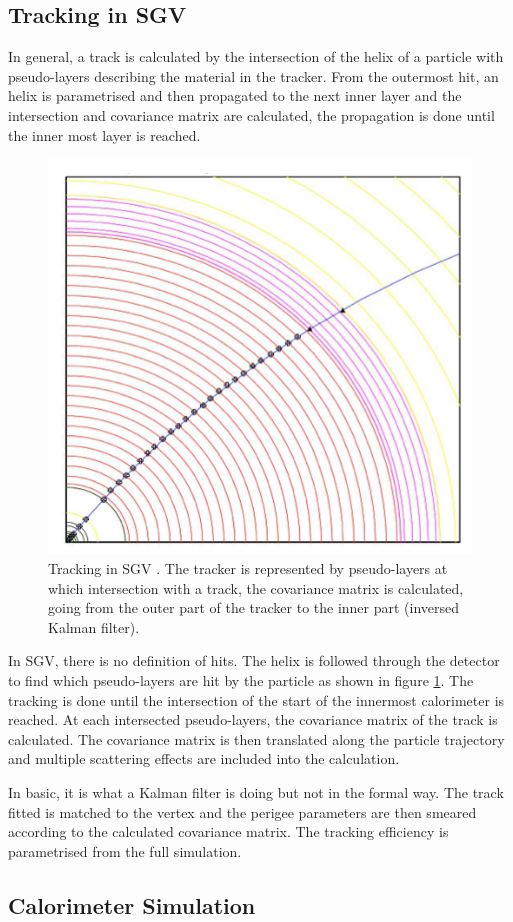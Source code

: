 \subsection{Tracking in SGV}

In general, a track is calculated by the intersection of the helix of a particle with pseudo-layers describing the material in the tracker. From the outermost hit, an helix is parametrised and then propagated to the next inner layer and the intersection and covariance matrix are calculated, the propagation is done until the inner most layer is reached.

\begin{figure}[t]
  \centering
  \includegraphics[width=0.3\linewidth]{chap6/fig_SGV/Tracking_SGV.png}
  \caption{Tracking in SGV \cite{Berggren2012}. The tracker is represented by pseudo-layers at which intersection with a track, the covariance matrix is calculated, going from the outer part of the tracker to the inner part (inversed Kalman filter).}
  \label{fig:tracking_sgv}
\end{figure}

In SGV, there is no definition of hits. The helix is followed through the detector to find which pseudo-layers are hit by the particle as shown in figure \ref{fig:tracking_sgv}. The tracking is done until the intersection of the start of the innermost calorimeter is reached. At each intersected pseudo-layers, the covariance matrix of the track is calculated. The covariance matrix is then translated along the particle trajectory and multiple scattering effects are included into the calculation.

In basic, it is what a Kalman filter \cite{Li2013} is doing but not in the formal way. The track fitted is matched to the vertex and the perigee parameters are then smeared according to the calculated covariance matrix. The tracking efficiency is parametrised from the full simulation.

\subsection{Calorimeter Simulation}

